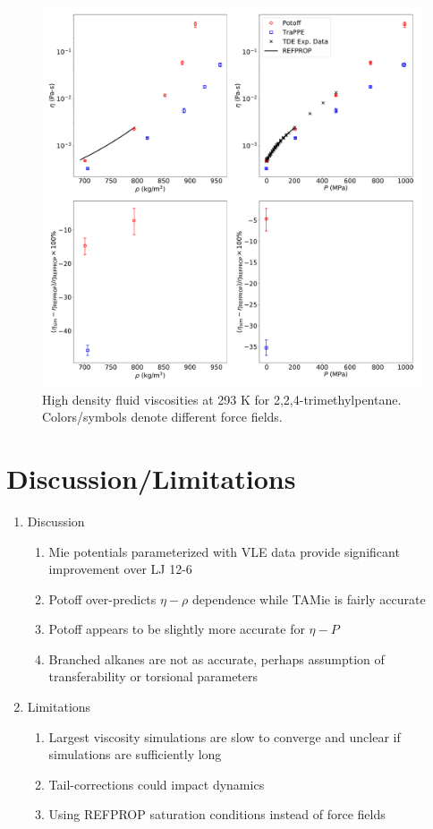 \documentclass[preprint,review,12pt]{elsarticle}
\begin{document}
\begin{figure}[p!]
	\centering
	\includegraphics[width=6.4in]{compare_REFPROP_T293highP_IC8H18.pdf}
	\caption{High density fluid viscosities at 293 K for 2,2,4-trimethylpentane. Colors/symbols denote different force fields.}
	\label{fig:T293highP_IC8}
\end{figure} 

\section{Discussion/Limitations}

\begin{enumerate}
	\item Discussion
	\begin{enumerate}
		\item Mie potentials parameterized with VLE data provide significant improvement over LJ 12-6
		\item Potoff over-predicts $\eta-\rho$ dependence while TAMie is fairly accurate
		\item Potoff appears to be slightly more accurate for $\eta-P$
		\item Branched alkanes are not as accurate, perhaps assumption of transferability or torsional parameters
	\end{enumerate}
    \item Limitations
    \begin{enumerate}
    	\item Largest viscosity simulations are slow to converge and unclear if simulations are sufficiently long
    	\item Tail-corrections could impact dynamics
    	\item Using REFPROP saturation conditions instead of force fields
    \end{enumerate}
\end{enumerate}
\end{document}
